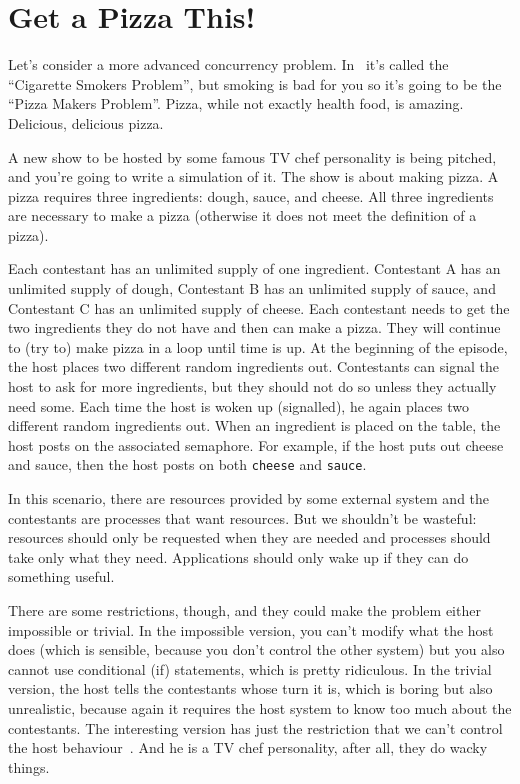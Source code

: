 




\section*{Get a Pizza This!}
Let's consider a more advanced concurrency problem. In~\cite{lbs} it's called the ``Cigarette Smokers Problem'', but smoking is bad for you so it's going to be the ``Pizza Makers Problem''. Pizza, while not exactly health food, is amazing. Delicious, delicious pizza.

A new show to be hosted by some famous TV chef personality is being pitched, and you're going to write a simulation of it. The show is about making pizza. A pizza requires three ingredients: dough, sauce, and cheese. All three ingredients are necessary to make a pizza (otherwise it does not meet the definition of a pizza).

Each contestant has an unlimited supply of one ingredient. Contestant A has an unlimited supply of dough, Contestant B has an unlimited supply of sauce, and Contestant C has an unlimited supply of cheese. Each contestant needs to get the two ingredients they do not have and then can make a pizza. They will continue to (try to) make pizza in a loop until time is up. At the beginning of the episode, the host places two different random ingredients out. Contestants can signal the host to ask for more ingredients, but they should not do so unless they actually need some. Each time the host is woken up (signalled), he again places two different random ingredients out. When an ingredient is placed on the table, the host posts on the associated semaphore. For example, if the host puts out cheese and sauce, then the host posts on both \texttt{cheese} and \texttt{sauce}.

In this scenario, there are resources provided by some external system and the contestants are processes that want resources. But we shouldn't be wasteful: resources should only be requested when they are needed and processes should take only what they need. Applications should only wake up if they can do something useful.

There are some restrictions, though, and they could make the problem either impossible or trivial. In the impossible version, you can't modify what the host does (which is sensible, because you don't control the other system) but you also cannot use conditional (if) statements, which is pretty ridiculous. In the trivial version, the host tells the contestants whose turn it is, which is boring but also unrealistic, because again it requires the host system to know too much about the contestants. The interesting version has just the restriction that we can't control the host behaviour~\cite{lbs}. And he is a TV chef personality, after all, they do wacky things.

